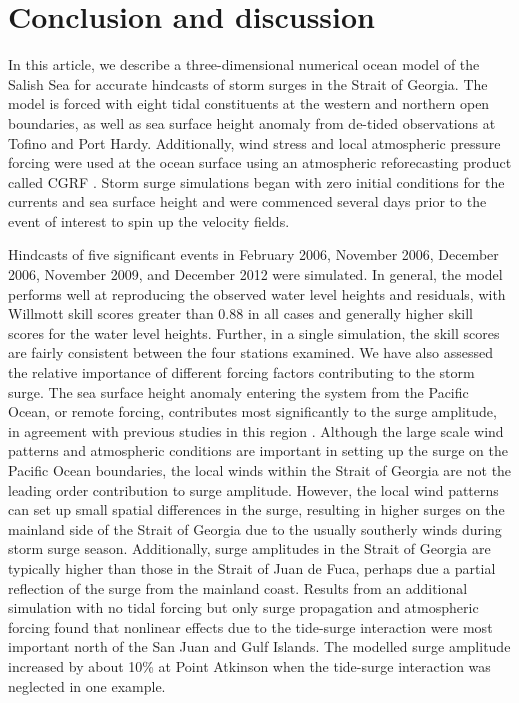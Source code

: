 \documentclass[letterpaper]{tATO2e}
\begin{document}
\section{Conclusion and discussion}\label{sec:diss}
In this article, we describe a three-dimensional numerical ocean model of the Salish Sea for accurate hindcasts of storm surges in the Strait of Georgia. The model is forced with eight tidal constituents at the western and northern open boundaries, as well as sea surface height anomaly from de-tided observations at Tofino and Port Hardy. Additionally, wind stress and local atmospheric pressure forcing were used at the ocean surface using an atmospheric reforecasting product called CGRF \citep{smith2014new}. Storm surge simulations began with zero initial conditions for the currents and sea surface height and were commenced several days prior to the event of interest to spin up the velocity fields. 

Hindcasts of five significant events in February 2006, November 2006, December 2006, November 2009, and December 2012 were simulated. In general, the model performs well at reproducing the observed water level heights and residuals, with Willmott skill scores greater than 0.88 in all cases and generally higher skill scores for the water level heights.  Further, in a single simulation, the skill scores are fairly consistent between the four stations examined. We have also assessed the relative importance of different forcing factors contributing to the storm surge. The sea surface height anomaly entering the system from the Pacific Ocean, or remote forcing,  contributes most significantly to the surge amplitude, in agreement with previous studies in this region \citep{murty1995storm}. Although the large scale wind patterns and atmospheric conditions are important in setting up the surge on the Pacific Ocean boundaries, the local winds within the Strait of Georgia are not the leading order contribution to surge amplitude. However, the local wind patterns can set up small spatial differences in the surge, resulting in higher surges on the mainland side of the Strait of Georgia due to the usually southerly winds during storm surge season. {\color{red}Additionally, surge amplitudes in the Strait of Georgia are typically higher than those in the Strait of Juan de Fuca, perhaps due a partial reflection of the surge from the mainland coast.} Results from an additional simulation with no tidal forcing but only surge propagation and atmospheric forcing found that nonlinear effects due to the tide-surge interaction were most important north of the San Juan and Gulf Islands. The modelled surge amplitude increased by about 10\% at Point Atkinson when the tide-surge interaction was neglected in one example. 
\end{document}
